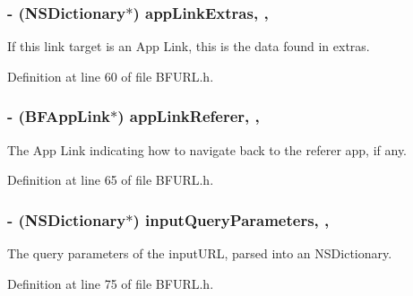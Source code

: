 \subsubsection[{app\+Link\+Extras}]{\setlength{\rightskip}{0pt plus 5cm}-\/ (N\+S\+Dictionary$\ast$) app\+Link\+Extras\hspace{0.3cm}{\ttfamily [read]}, {\ttfamily [nonatomic]}, {\ttfamily [strong]}}\label{interface_b_f_u_r_l_a47ef1fbe340b610c07b6f80e0c3c16ab}
If this link target is an App Link, this is the data found in extras. 

Definition at line 60 of file B\+F\+U\+R\+L.\+h.

\hypertarget{interface_b_f_u_r_l_a0256b0b7763ce81aa3556c13d2363f57}{}
\subsubsection[{app\+Link\+Referer}]{\setlength{\rightskip}{0pt plus 5cm}-\/ ({\bf B\+F\+App\+Link}$\ast$) app\+Link\+Referer\hspace{0.3cm}{\ttfamily [read]}, {\ttfamily [nonatomic]}, {\ttfamily [strong]}}\label{interface_b_f_u_r_l_a0256b0b7763ce81aa3556c13d2363f57}
The App Link indicating how to navigate back to the referer app, if any. 

Definition at line 65 of file B\+F\+U\+R\+L.\+h.

\hypertarget{interface_b_f_u_r_l_a03a744a57286fa44530dcfc5528fa49d}{}
\subsubsection[{input\+Query\+Parameters}]{\setlength{\rightskip}{0pt plus 5cm}-\/ (N\+S\+Dictionary$\ast$) input\+Query\+Parameters\hspace{0.3cm}{\ttfamily [read]}, {\ttfamily [nonatomic]}, {\ttfamily [strong]}}\label{interface_b_f_u_r_l_a03a744a57286fa44530dcfc5528fa49d}
The query parameters of the input\+U\+R\+L, parsed into an N\+S\+Dictionary. 

Definition at line 75 of file B\+F\+U\+R\+L.\+h.

\hypertarget{interface_b_f_u_r_l_a588a05e6eaedf5f9b17ce0f85edbef20}{}
